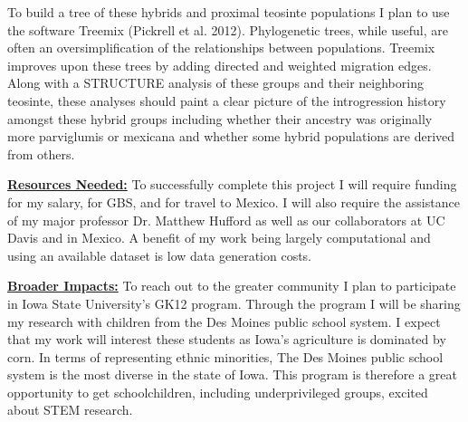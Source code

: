 \documentclass[12pt]{amsart}
\begin{document}
To build a tree of these hybrids and proximal teosinte populations I plan to use the software Treemix (Pickrell et al. 2012).
Phylogenetic trees, while useful, are often an oversimplification of the relationships between populations. 
Treemix improves upon these trees by adding directed and weighted migration edges. 
Along with a STRUCTURE analysis of these groups and their neighboring teosinte, these analyses should paint a clear picture of the introgression history amongst these hybrid groups including whether their ancestry was originally more parviglumis or mexicana and whether some hybrid populations are derived from others.

\hfill\break \textbf{\underline{Resources Needed:} } To successfully complete this project I will require funding for my salary, for GBS, and for travel to Mexico.  I will also require the assistance of my major professor Dr. Matthew Hufford as well as our collaborators at UC Davis and in Mexico.
A benefit of my work being largely computational and using an available dataset is low data generation costs.

\hfill\break \textbf{\underline{Broader Impacts:} }
To reach out to the greater community I plan to participate in Iowa State University's GK12 program.  Through the program I will be sharing my research with children from the Des Moines public school system.  
I expect that my work will interest these students as Iowa's agriculture is dominated by corn.
In terms of representing ethnic minorities, The Des Moines public school system is the most diverse in the state of Iowa.  This program is therefore a great opportunity to get schoolchildren, including underprivileged groups, excited about STEM research.  
\end{document}
